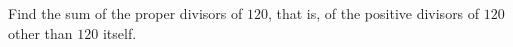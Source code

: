 Find the sum of the proper divisors of $120$, that is, of the positive divisors of $120$ other than $120$ itself.
